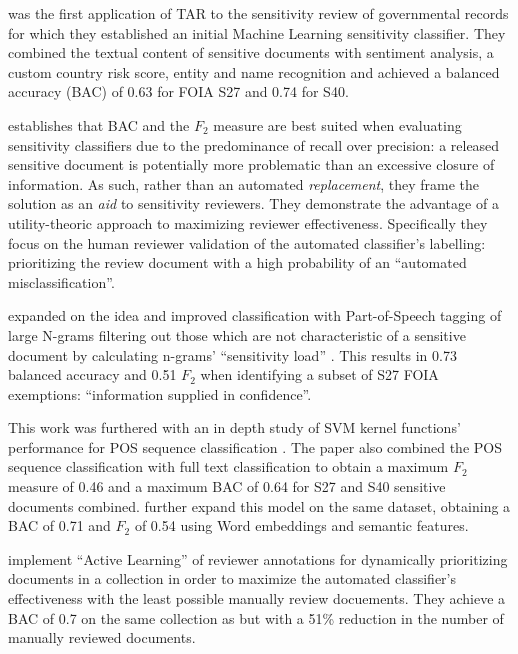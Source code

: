 \documentclass[\version]{l4proj}
\begin{document}
\textcite{mcdonaldClassifierDigitalSensitivity2014} was the first application of TAR to the sensitivity review of governmental records for which they established an initial Machine Learning sensitivity classifier.
They combined the textual content of sensitive documents with sentiment analysis, a custom country risk score, entity and name recognition and achieved a balanced accuracy (BAC) of 0.63 for FOIA S27 and 0.74 for S40.

\textcite{berardiSemiAutomatedTextClassification2015} establishes that BAC and the \(F_{2}\) measure are best suited when evaluating sensitivity classifiers due to the predominance of recall over precision: a released sensitive document is potentially more problematic than an excessive closure of information.
As such, rather than an automated \textit{replacement}, they frame the solution as an \textit{aid} to sensitivity reviewers.
They demonstrate the advantage of a utility-theoric approach to maximizing reviewer effectiveness.
Specifically they focus on the human reviewer validation of the automated classifier's labelling: prioritizing the review document with a high probability of an ``automated misclassification''.

\textcite{mcdonaldUsingPartofSpeechNgrams2015} expanded on the idea and improved classification with Part-of-Speech tagging of large N-grams filtering out those which are not characteristic of a sensitive document by calculating n-grams' ``sensitivity load'' \autocite[2]{mcdonaldUsingPartofSpeechNgrams2015}.
This results in 0.73 balanced accuracy and 0.51 \(F_{2}\) when identifying a subset of S27 FOIA exemptions: ``information supplied in confidence''.

This work was furthered with an in depth study of SVM kernel functions' performance for POS sequence classification \autocite{mcdonaldStudySVMKernel2017}.
The paper also combined the POS sequence classification with full text classification to obtain a maximum \(F_{2}\) measure of 0.46 and a maximum BAC of 0.64 for S27 and S40 sensitive documents combined.
\autocite{mcdonaldEnhancingSensitivityClassification2017} further expand this model on the same dataset, obtaining a BAC of 0.71 and \(F_{2}\) of 0.54 using Word embeddings and semantic features.

\textcite{mcdonaldActiveLearningStrategies2018} implement ``Active Learning'' of reviewer annotations for dynamically prioritizing documents in a collection in order to maximize the automated classifier's effectiveness with the least possible manually review docuements.
They achieve a BAC of 0.7 on the same collection as \textcite{mcdonaldStudySVMKernel2017,mcdonaldEnhancingSensitivityClassification2017} but with a 51\% reduction in the number of manually reviewed documents.
\end{document}

